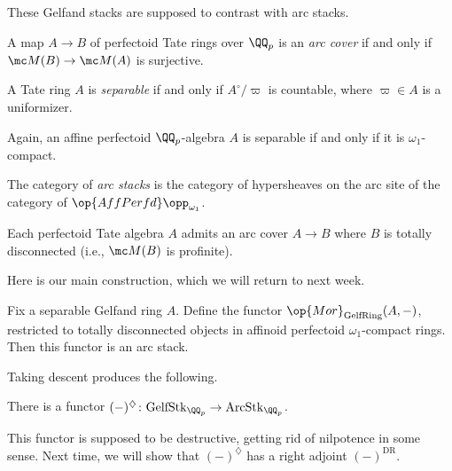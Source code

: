 \documentclass{article}
\begin{document}
These Gelfand stacks are supposed to contrast with arc stacks.
\begin{definition}
	A map $A\to B$ of perfectoid Tate rings over $\QQ_p$ is an \textit{arc cover} if and only if $\mc M(B)\to\mc M(A)$ is surjective.
\end{definition}
\begin{definition}[separable]
	A Tate ring $A$ is \textit{separable} if and only if $A^\circ/\varpi$ is countable, where $\varpi\in A$ is a uniformizer.
\end{definition}
\begin{remark}
	Again, an affine perfectoid $\QQ_p$-algebra $A$ is separable if and only if it is $\omega_1$-compact.
\end{remark}
\begin{definition}
	The category of \textit{arc stacks} is the category of hypersheaves on the arc site of the category of $\op{AffPerfd}\opp_{\omega_1}$.
\end{definition}
\begin{remark}
	Each perfectoid Tate algebra $A$ admits an arc cover $A\to B$ where $B$ is totally disconnected (i.e., $\mc M(B)$ is profinite).
\end{remark}
Here is our main construction, which we will return to next week.
\begin{proposition}
	Fix a separable Gelfand ring $A$. Define the functor $\op{Mor}_{\mathrm{GelfRing}}(A,-)$, restricted to totally disconnected objects in affinoid perfectoid $\omega_1$-compact rings. Then this functor is an arc stack.
\end{proposition}
Taking descent produces the following.
\begin{corollary}
	There is a functor $(-)^\diamondsuit\colon\mathrm{GelfStk}_{\QQ_p}\to\mathrm{ArcStk}_{\QQ_p}$.
\end{corollary}
This functor is supposed to be destructive, getting rid of nilpotence in some sense. Next time, we will show that $(-)^\diamondsuit$ has a right adjoint $(-)^{\mathrm{DR}}$.
\end{document}
